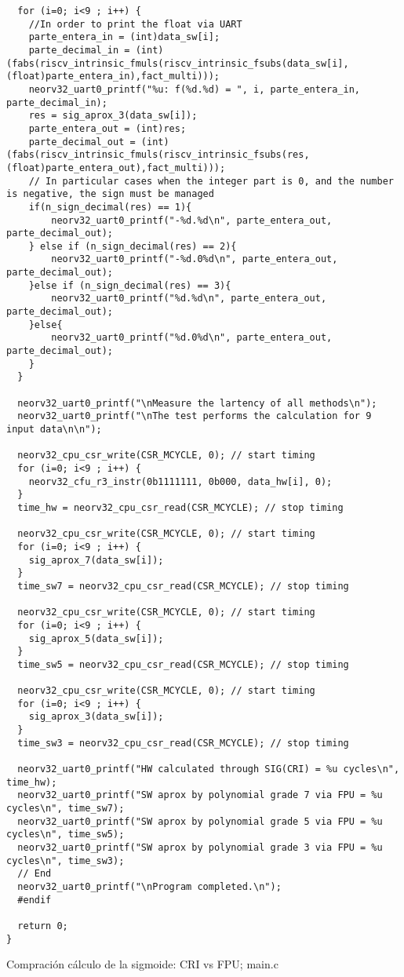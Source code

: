 \begin{code}
\begin{verbatim}
  for (i=0; i<9 ; i++) {
    //In order to print the float via UART
    parte_entera_in = (int)data_sw[i];
    parte_decimal_in = (int)(fabs(riscv_intrinsic_fmuls(riscv_intrinsic_fsubs(data_sw[i], (float)parte_entera_in),fact_multi)));
    neorv32_uart0_printf("%u: f(%d.%d) = ", i, parte_entera_in, parte_decimal_in);
    res = sig_aprox_3(data_sw[i]);
    parte_entera_out = (int)res;
    parte_decimal_out = (int)(fabs(riscv_intrinsic_fmuls(riscv_intrinsic_fsubs(res, (float)parte_entera_out),fact_multi)));
    // In particular cases when the integer part is 0, and the number is negative, the sign must be managed
    if(n_sign_decimal(res) == 1){
        neorv32_uart0_printf("-%d.%d\n", parte_entera_out, parte_decimal_out);
    } else if (n_sign_decimal(res) == 2){
        neorv32_uart0_printf("-%d.0%d\n", parte_entera_out, parte_decimal_out);
    }else if (n_sign_decimal(res) == 3){
        neorv32_uart0_printf("%d.%d\n", parte_entera_out, parte_decimal_out);
    }else{
        neorv32_uart0_printf("%d.0%d\n", parte_entera_out, parte_decimal_out);
    }
  }

  neorv32_uart0_printf("\nMeasure the lartency of all methods\n");
  neorv32_uart0_printf("\nThe test performs the calculation for 9 input data\n\n");

  neorv32_cpu_csr_write(CSR_MCYCLE, 0); // start timing
  for (i=0; i<9 ; i++) {
    neorv32_cfu_r3_instr(0b1111111, 0b000, data_hw[i], 0);
  } 
  time_hw = neorv32_cpu_csr_read(CSR_MCYCLE); // stop timing

  neorv32_cpu_csr_write(CSR_MCYCLE, 0); // start timing
  for (i=0; i<9 ; i++) {
    sig_aprox_7(data_sw[i]);
  } 
  time_sw7 = neorv32_cpu_csr_read(CSR_MCYCLE); // stop timing

  neorv32_cpu_csr_write(CSR_MCYCLE, 0); // start timing
  for (i=0; i<9 ; i++) {
    sig_aprox_5(data_sw[i]);
  } 
  time_sw5 = neorv32_cpu_csr_read(CSR_MCYCLE); // stop timing

  neorv32_cpu_csr_write(CSR_MCYCLE, 0); // start timing
  for (i=0; i<9 ; i++) {
    sig_aprox_3(data_sw[i]);
  } 
  time_sw3 = neorv32_cpu_csr_read(CSR_MCYCLE); // stop timing

  neorv32_uart0_printf("HW calculated through SIG(CRI) = %u cycles\n", time_hw);
  neorv32_uart0_printf("SW aprox by polynomial grade 7 via FPU = %u cycles\n", time_sw7);
  neorv32_uart0_printf("SW aprox by polynomial grade 5 via FPU = %u cycles\n", time_sw5);
  neorv32_uart0_printf("SW aprox by polynomial grade 3 via FPU = %u cycles\n", time_sw3);
  // End
  neorv32_uart0_printf("\nProgram completed.\n");
  #endif

  return 0;
}
\end{verbatim}
\caption{Compración cálculo de la sigmoide: CRI vs FPU; main.c}
\label{ap-cod:27}
\end{code}
